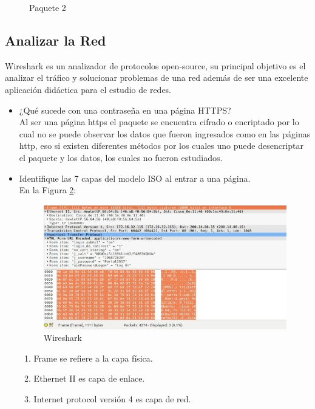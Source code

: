 \documentclass{article}
\begin{document}
\begin{itemize}
\begin{figure}[h!]
\caption{Paquete 2}
\label{fig:paq3}
\end{figure}

\end{itemize}

\newpage
\subsection{Analizar la Red \vspace{0.3cm}}
Wireshark es un analizador de protocolos open-source, su principal objetivo es el analizar el tráfico y solucionar problemas de una red además de ser una excelente aplicación didáctica para el estudio de redes.
\begin{itemize}
    \item ¿Qué sucede con una contraseña en una página
HTTPS?\\
\newline Al ser una página https el paquete se encuentra cifrado o encriptado por lo cual no se puede observar los datos que fueron ingresados como en las páginas http, eso si existen diferentes métodos por los cuales uno puede desencriptar el paquete y los datos, los cuales no fueron estudiados.
    \item Identifique las 7 capas del modelo ISO al entrar
a una página.\\
\newline En la Figura \ref{fig:cap1}:
\begin{figure}[h!]
\centering
\includegraphics[scale=0.8]{cap.jpg}
\caption{Wireshark}
\label{fig:cap1}
\end{figure}
\begin{enumerate}
    \item Frame se refiere a la capa física.
    \item Ethernet II es capa de enlace.
    \item Internet protocol versión 4 es capa de red.

\end{enumerate}
\end{itemize}
\end{document}
